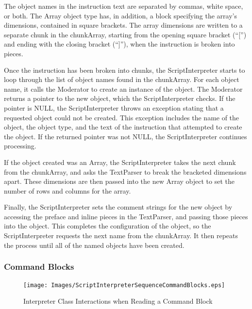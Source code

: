 The object names in the instruction text are separated by commas, white space, or both.  The Array
object type has, in addition, a block specifying the array's dimensions, contained in square
brackets. The array dimensions are written to a separate chunk in the chunkArray, starting from the
opening square bracket (``['') and ending with the closing bracket (``]''), when the instruction is
broken into pieces.

Once the instruction has been broken into chunks, the ScriptInterpreter starts to loop through the
list of object names found in the chunkArray.  For each object name, it calls the Moderator to
create an instance of the object.  The Moderator returns a pointer to the new object, which the
ScriptInterpreter checks.  If the pointer is NULL, the ScriptInterpreter throws an exception
stating that a requested object could not be created.  This exception includes the name of the
object, the object type, and the text of the instruction that attempted to create the object.  If
the returned pointer was not NULL, the ScriptInterpreter continues processing.

If the object created was an Array, the ScriptInterpreter takes the next chunk from the chunkArray,
and asks the TextParser to break the bracketed dimensions apart.  These dimensions are then passed
into the new Array object to set the number of rows and columns for the array.

Finally, the ScriptInterpreter sets the comment strings for the new object by accessing the preface
and inline pieces in the TextParser, and passing those pieces into the object.  This completes the
configuration of the object, so the ScriptInterpreter requests the next name from the chunkArray.
It then repeats the process until all of the named objects have been created.

\subsubsection{\label{section:ParsingCommandBlocks}Command Blocks}

\begin{figure}
\begin{center}
\texttt{[image: Images/ScriptInterpreterSequenceCommandBlocks.eps]}
\caption{\label{figure:InterpreterReadInteractionsCommandBlock}Interpreter Class Interactions when
Reading a Command Block}
\end{center}
\end{figure}

